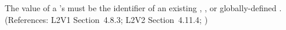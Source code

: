 The value of a \RateRule's  must be the identifier
of an existing \Compartment, \Species, or globally-defined \Parameter.
(References: L2V1 Section~4.8.3; L2V2 Section~4.11.4; )
